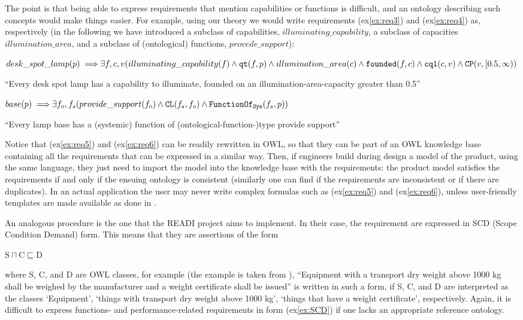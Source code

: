 \documentclass[sw]{iosart2x}
\newcommand{\bflist}{\begin{list}{}{\setlength{\topsep}{2mm}\setlength{\partopsep}{0mm}\setlength{\parsep}{0mm}\setlength{\leftmargin}{9mm}\setlength{\labelwidth}{8mm}}}
\newcommand{\eflist}{\end{list}}
\newcommand{\ExLabel}{\textrm{ex}}
\newcommand{\myex}[1]{\refstepcounter{cntex}\begin{small}{\bf \ExLabel\thecntex\label{ex:#1}}\end{small}}
\newcounter{cntex}
\newcommand{\mytext}[1]{``#1''}
\newcommand{\refex}[1]{({\ExLabel}\ref{#1})}
\newcommand{\generalStyle}[1]{\texttt{#1}}
\newcommand{\biRel}[3]{\generalStyle{#1}(#2,#3)}
\newcommand{\biRelPar}[4]{\generalStyle{#1}_{\generalStyle{#4}}(#2,#3)}
\newcommand{\myfi}{\hspace{0.9mm} \Longrightarrow}
\newcommand{\OWL}{\textnormal{OWL}\xspace}
\newcommand{\DOLCEPartBin}[2]{\biRel{{CP}}{#1}{#2}}
\newcommand{\DOLCEQualityDirect}[2]{\biRel{qt}{#1}{#2}}
\newcommand{\DOLCEQualeDirect}[2]{\biRel{{cql}}{#1}{#2}}
\newcommand{\DOLCECLbyBinary}[2]{\biRel{CL}{#1}{#2}}
\newcommand{\FunctionSysOf}[2]{\biRelPar{FunctionOf}{#1}{#2}{Sys}}
\newcommand{\founded}[2]{\biRel{\foundedTerm{passive}}{#1}{#2}}
\newcommand{\foundedTerm}[1]{%
  \ifthenelse{\equal{#1}{passive}}{founded}{%
    \ifthenelse{\equal{#1}{verb}}{found}{%
      \ifthenelse{\equal{#1}{gerund}}{founding}{%
        ERROR!%
      }%
    }%
  }%
}
\newcommand{\quotes}[1]{`#1'}
\newcommand{\qquotes}[1]{``#1''}
\begin{document}
The point is that being able to express requirements that mention capabilities or functions is difficult, and an ontology describing such concepts would make things easier.
For example, using our theory we would write requirements \refex{ex:req3} and \refex{ex:req4} as, respectively (in the following we have introduced a subclass of capabilities, $illuminating\_capability$, a subclass of capacities $illumination\_area$, and a subclass of (ontological) functions, $provede\_support$):
\bflist
  \item[\myex{req5}] $ desk\_spot\_lamp(p) \myfi \exists f,c,v( illuminating\_capability(f) \land \DOLCEQualityDirect{f}{p} \land illumination\_area(c) \land \\ \founded{f}{c} \land \DOLCEQualeDirect{c}{v} \land \DOLCEPartBin{v}{[0.5, \infty)}$
  \item[] \mytext{Every desk spot lamp has a capability to illuminate, founded on an illumination-area-capacity greater than 0.5} 
  \item[\myex{req6}] $ base(p) \myfi \exists f_o,f_s (provide\_support(f_o) \land \DOLCECLbyBinary{f_s}{f_o} \land \FunctionSysOf{f_s}{p})$
  \item[] \mytext{Every lamp base has a (systemic) function of (ontological-function-)type provide support} 
\eflist
Notice that \refex{ex:req5} and \refex{ex:req6} can be readily rewritten in \OWL, so that they can be part of an \OWL knowledge base containing all the requirements that can be expressed in a similar way. 
Then, if engineers build during design a model of the product, using the same language, they just need to import the model into the knowledge base with the requirements: the product model satisfies the requirements if and only if the ensuing ontology is consistent (similarly one can find if the requirements are inconsistent or if there are duplicates).  
In an actual application the user may never write complex formulas such as \refex{ex:req5} and \refex{ex:req6}, unless user-friendly templates are made available as done in \cite{chenOntologybasedRequirementVerification2020}.  

An analogous procedure is the one that the READI project \cite{overliAssetInformationModelling2021,kluwerOntologybasedRequirementsManagement2018} aims to implement. 
In their case, the requirement are expressed in SCD (Scope Condition Demand) form.
This means that they are assertions of the form
\bflist
  \item[\myex{SCD}] $ \text{S} \sqcap \text{C} \sqsubseteq \text{D}  $
\eflist
where S, C, and D are \OWL classes, for example (the example is taken from \cite{overliAssetInformationModelling2021}), \qquotes{Equipment with a transport dry weight above 1000 kg shall be weighed by the manufacturer and a weight certificate shall be issued} is written in such a form, if S, C, and D are interpreted as the classes \quotes{Equipment}, \quotes{things with transport dry weight above 1000 kg}, \quotes{things that have a weight certificate}, respectively.   
Again, it is difficult to express functions- and performance-related requirements in form \refex{ex:SCD} if one lacks an appropriate reference ontology. 
\end{document}

